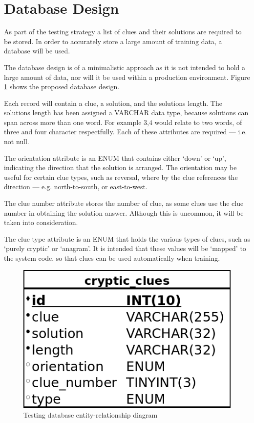 \section{Database Design}
\label{sec:database_design}

As part of the testing strategy a list of clues and their solutions are required
to be stored. In order to accurately store a large amount of training data, a 
database will be used.

The database design is of a minimalistic approach as it is not intended to hold
a large amount of data, nor will it be used within a production environment. 
Figure \ref{fig:database_erd} shows the proposed database design.

Each record will contain a clue, a solution, and the solutions length. The
solutions length has been assigned a VARCHAR data type, because solutions can
span across more than one word. For example 3,4 would relate to two words, of
three and four character respectfully. Each of these attributes are required ---
i.e. not null.

The orientation attribute is an ENUM that contains either `down' or `up', 
indicating the direction that the solution is arranged. The orientation may be 
useful for certain clue types, such as reversal, where by the clue references 
the direction --- e.g. north-to-south, or east-to-west.

The clue number attribute stores the number of clue, as some clues use the clue 
number in obtaining the solution answer. Although this is uncommon, it will be 
taken into consideration.

The clue type attribute is an ENUM that holds the various types of clues, 
such as `purely cryptic' or `anagram'. It is intended that these values will be 
`mapped' to the system code, so that clues can be used automatically when 
training.

\begin{figure}[H]
  \centering
  \includegraphics[scale=0.5]{design/database/database.png}
  \caption{Testing database entity-relationship diagram}
  \label{fig:database_erd}
\end{figure}
